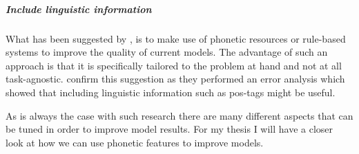 \subparagraph{Include linguistic information} What has been suggested by \cite{gorman-etal-2020-sigmorphon}, is to make use of phonetic resources or rule-based systems to improve the quality of current models. The advantage of such an approach is that it is specifically tailored to the problem at hand and not at all task-agnostic. \cite{makarov-clematide-2020-cluzh} confirm this suggestion as they performed an error analysis which showed that including linguistic information such as \ac{pos}-tags might be useful. 

As is always the case with such research there are many different aspects that can be tuned in order to improve model results. For my thesis I will have a closer look at how we can use phonetic features to improve models. 
\begin{landscape}
\thispagestyle{empty}
\end{landscape}
